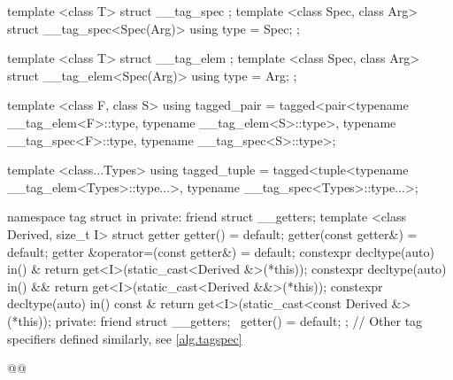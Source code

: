 \begin{codeblock}
{  template <class T>
  struct __tag_spec { };
  template <class Spec, class Arg>
  struct __tag_spec<Spec(Arg)> { using type = Spec; };

  template <class T>
  struct __tag_elem { };
  template <class Spec, class Arg>
  struct __tag_elem<Spec(Arg)> { using type = Arg; };

  template <class F, class S>
  using tagged_pair =
    tagged<pair<typename __tag_elem<F>::type, typename __tag_elem<S>::type>,
           typename __tag_spec<F>::type, typename __tag_spec<S>::type>;

  template <class...Types>
  using tagged_tuple =
    tagged<tuple<typename __tag_elem<Types>::type...>,
           typename __tag_spec<Types>::type...>;

  namespace tag {
    struct in {
    private:
      friend struct __getters;
      template <class Derived, size_t I>
      struct getter {
        getter() = default;
        getter(const getter&) = default;
        getter &operator=(const getter&) = default;
        constexpr decltype(auto) in() & {
          return get<I>(static_cast<Derived &>(*this));
        }
        constexpr decltype(auto) in() && {
          return get<I>(static_cast<Derived &&>(*this));
        }
        constexpr decltype(auto) in() const & {
          return get<I>(static_cast<const Derived &>(*this));
        }
      private:
        friend struct __getters;
        ~getter() = default;
      };
    }
    // Other tag specifiers defined similarly, see \ref{alg.tagspec}
  }
}@\newtxt{\}\}}@
\end{codeblock}
